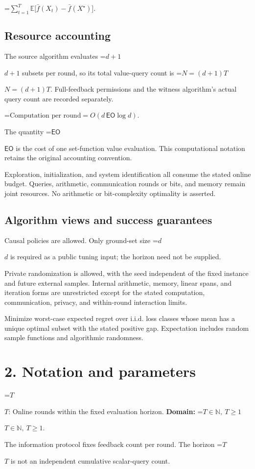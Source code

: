 \documentclass[10pt,a4paper]{article}
\newcommand{\AtlasMath}[1]{\par\begingroup\centering\setbox0=\hbox{$\displaystyle #1$}\ifdim\wd0>1.4\linewidth\typeout{ATLAS WIDE FORMULA: \the\wd0}\fi\ifdim\wd0>\linewidth\resizebox{\linewidth}{!}{\box0}\else\box0\fi\par\endgroup}
\newcommand{\AtlasInlineMath}[1]{\begingroup\setbox0=\hbox{$#1$}\ifdim\wd0>.4\linewidth\endgroup\AtlasMath{#1}\else\endgroup$#1$\fi}
\begin{document}
\AtlasMath{\sum_{t=1}^{T}\mathbb{E}\bigl[\bar f(X_t)-\bar f(X^\star)\bigr].}


\subsection{Resource accounting}
The source algorithm evaluates \AtlasInlineMath{d+1} subsets per round, so its total value-query count is \AtlasInlineMath{N=(d+1)T}. Full-feedback permissions and the witness algorithm's actual query count are recorded separately.


\AtlasMath{\text{Computation per round}=O(d\,\mathsf{EO}\log d).}


The quantity \AtlasInlineMath{\mathsf{EO}} is the cost of one set-function value evaluation. This computational notation retains the original accounting convention.

Exploration, initialization, and system identification all consume the stated online budget. Queries, arithmetic, communication rounds or bits, and memory remain joint resources. No arithmetic or bit-complexity optimality is asserted.

\subsection{Algorithm views and success guarantees}
Causal policies are allowed. Only ground-set size \AtlasInlineMath{d} is required as a public tuning input; the horizon need not be supplied.

Private randomization is allowed, with the seed independent of the fixed instance and future external samples. Internal arithmetic, memory, linear spans, and iteration forms are unrestricted except for the stated computation, communication, privacy, and within-round interaction limits.

Minimize worst-case expected regret over i.i.d. loss classes whose mean has a unique optimal subset with the stated positive gap. Expectation includes random sample functions and algorithmic randomness.

\section{2. Notation and parameters}
\AtlasInlineMath{T}: Online rounds within the fixed evaluation horizon. \textbf{Domain:} \AtlasInlineMath{T\in\mathbb N,\ T\ge1}.

The information protocol fixes feedback count per round. The horizon \AtlasInlineMath{T} is not an independent cumulative scalar-query count.
\end{document}
